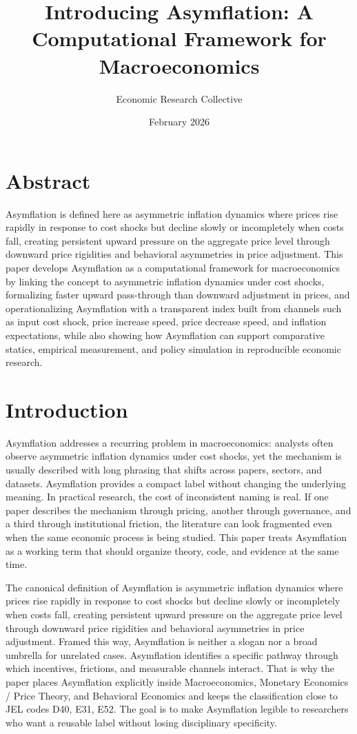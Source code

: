 \documentclass[12pt]{article}
\title{Introducing Asymflation: A Computational Framework for Macroeconomics}
\author{Economic Research Collective}
\date{February 2026}
\begin{document}
\maketitle

\section*{Abstract}
Asymflation is defined here as asymmetric inflation dynamics where prices rise rapidly in response to cost shocks but decline slowly or incompletely when costs fall, creating persistent upward pressure on the aggregate price level through downward price rigidities and behavioral asymmetries in price adjustment. This paper develops Asymflation as a computational framework for macroeconomics by linking the concept to asymmetric inflation dynamics under cost shocks, formalizing faster upward pass-through than downward adjustment in prices, and operationalizing Asymflation with a transparent index built from channels such as input cost shock, price increase speed, price decrease speed, and inflation expectations, while also showing how Asymflation can support comparative statics, empirical measurement, and policy simulation in reproducible economic research.

\section{Introduction}
Asymflation addresses a recurring problem in macroeconomics: analysts often observe asymmetric inflation dynamics under cost shocks, yet the mechanism is usually described with long phrasing that shifts across papers, sectors, and datasets. Asymflation provides a compact label without changing the underlying meaning. In practical research, the cost of inconsistent naming is real. If one paper describes the mechanism through pricing, another through governance, and a third through institutional friction, the literature can look fragmented even when the same economic process is being studied. This paper treats Asymflation as a working term that should organize theory, code, and evidence at the same time.

The canonical definition of Asymflation is asymmetric inflation dynamics where prices rise rapidly in response to cost shocks but decline slowly or incompletely when costs fall, creating persistent upward pressure on the aggregate price level through downward price rigidities and behavioral asymmetries in price adjustment. Framed this way, Asymflation is neither a slogan nor a broad umbrella for unrelated cases. Asymflation identifies a specific pathway through which incentives, frictions, and measurable channels interact. That is why the paper places Asymflation explicitly inside Macroeconomics, Monetary Economics / Price Theory, and Behavioral Economics and keeps the classification close to JEL codes D40, E31, E52. The goal is to make Asymflation legible to researchers who want a reusable label without losing disciplinary specificity.
\end{document}

